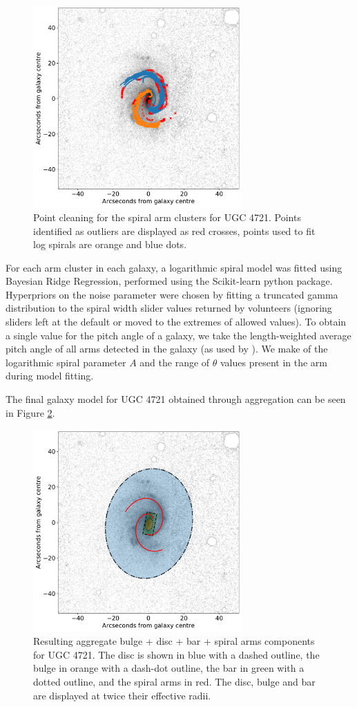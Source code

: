 \documentclass[../main.tex]{subfiles}
\begin{document}
\begin{figure}
  \includegraphics[width=8cm]{images__method/LOF_cleaning.pdf}
  \caption{Point cleaning for the spiral arm clusters for UGC 4721. Points identified as outliers are displayed as red crosses, points used to fit log spirals are orange and blue dots.}
  \label{fig:LOF_cleaning}
\end{figure}

For each arm cluster in each galaxy, a logarithmic spiral model was fitted using Bayesian Ridge Regression, performed using the Scikit-learn python package. Hyperpriors on the noise parameter were chosen by fitting a truncated gamma distribution \citep{2014arXiv1401.0287Z} to the spiral width slider values returned by volunteers (ignoring sliders left at the default or moved to the extremes of allowed values). To obtain a single value for the pitch angle of a galaxy, we take the length-weighted average pitch angle of all arms detected in the galaxy (as used by \citealt{Davis2014:1402.1910v1}). We make of the logarithmic spiral parameter $A$ and the range of $\theta$ values present in the arm during model fitting.

The final galaxy model for UGC 4721 obtained through aggregation can be seen in Figure \ref{fig:aggregate_model}.

\begin{figure}
  \includegraphics[width=8cm]{images__method/aggregate_model.pdf}
  \caption{Resulting aggregate bulge + disc + bar + spiral arms components for UGC 4721. The disc is shown in blue with a dashed outline, the bulge in orange with a dash-dot outline, the bar in green with a dotted outline, and the spiral arms in red. The disc, bulge and bar are displayed at twice their effective radii.}
  \label{fig:aggregate_model}
\end{figure}
\end{document}
